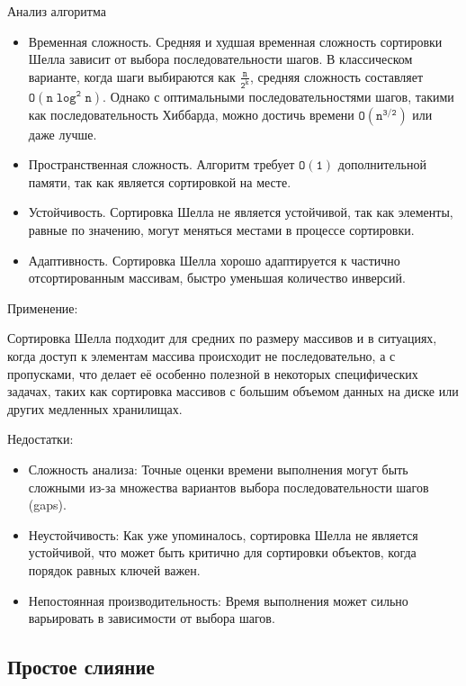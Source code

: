 \documentclass[]{article}
\theoremstyle{remark}
\theoremstyle{definition}
\newcommand{\term}[1]{$\mathtt{#1}$}
\begin{document}
\par Анализ алгоритма

\begin{itemize}
    \item Временная сложность. Средняя и худшая временная сложность сортировки Шелла зависит от выбора последовательности шагов. В классическом варианте, когда шаги выбираются как \term{\frac{n}{2^k}}, средняя сложность составляет \term{O(n \log^2 n)}. Однако с оптимальными последовательностями шагов, такими как последовательность Хиббарда, можно достичь времени \term{O(n^{3/2})} или даже лучше.
    \item Пространственная сложность. Алгоритм требует \term{O(1)} дополнительной памяти, так как является сортировкой на месте.
    \item Устойчивость. Сортировка Шелла не является устойчивой, так как элементы, равные по значению, могут меняться местами в процессе сортировки.
    \item Адаптивность. Сортировка Шелла хорошо адаптируется к частично отсортированным массивам, быстро уменьшая количество инверсий.
\end{itemize}


\par Применение:
\par Сортировка Шелла подходит для средних по размеру массивов и в ситуациях, когда доступ к элементам массива происходит не последовательно, а с пропусками, что делает её особенно полезной в некоторых специфических задачах, таких как сортировка массивов с большим объемом данных на диске или других медленных хранилищах.

\par Недостатки:

\begin{itemize}
    \item Сложность анализа: Точные оценки времени выполнения могут быть сложными из-за множества вариантов выбора последовательности шагов (gaps).
    \item Неустойчивость: Как уже упоминалось, сортировка Шелла не является устойчивой, что может быть критично для сортировки объектов, когда порядок равных ключей важен.
    \item Непостоянная производительность: Время выполнения может сильно варьировать в зависимости от выбора шагов.
\end{itemize}

\subsection{Простое слияние}
\end{document}
